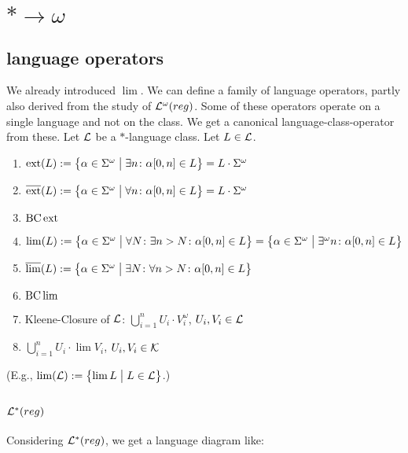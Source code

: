 \section{$* \rightarrow \omega$}

\subsection{ language operators}

We already introduced $\lim$. We can define a family of language operators, partly also derived from the study of $\mathcal{L}^\omega(reg)$. Some of these operators operate on a single language and not on the class. We get a canonical language-class-operator from these. Let $\mathcal{L}$ be a $*$-language class. Let $L \in \mathcal{L}$.

\begin{enumerate}
\item $\ext(L) := \Set{\alpha \in \Sigma^\omega}{ \exists n \colon \alpha[0,n] \in L} = L \cdot \Sigma^\omega$
\item $\overline{\ext}(L) := \Set{\alpha \in \Sigma^\omega}{ \forall n \colon \alpha[0,n] \in L} = L \cdot \Sigma^\omega$
\item $\operatorname{BC} \operatorname{ext}$
\item $\lim(L) := \Set{ \alpha \in \Sigma^\omega }{ \forall N \colon \exists n > N \colon \alpha[0,n] \in L } = \Set{ \alpha \in \Sigma^\omega }{ \exists^\omega n \colon \alpha[0,n] \in L }$
\item $\overline{\lim}(L) := \Set{ \alpha \in \Sigma^\omega }{ \exists N \colon \forall n > N \colon \alpha[0,n] \in L }$
\item $\operatorname{BC} \lim$
\item Kleene-Closure of $\mathcal{L}$: $\bigcup_{i=1}^n U_i \cdot V_i^\omega$, $U_i, V_i \in \mathcal{L}$
\item $\bigcup_{i=1}^n U_i \cdot \lim V_i$, $U_i, V_i \in \mathcal{K}$
\end{enumerate}

(E.g., $\lim(\Lang) := \Set{\lim L}{L \in \Lang}$.)

\subsection{$\mathcal{L}^*(reg)$}

Considering $\mathcal{L}^*(reg)$, we get a language diagram like:


